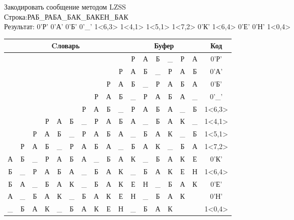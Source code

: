 \documentclass[a4paper, 12pt]{article}
\begin{document}
Закодировать сообщение методом LZSS\\
Строка:РАБ\_РАБА\_БАК\_БАКЕН\_БАК\\
Результат: 0'Р' 0'А' 0'Б' 0'\_' 1<6,3> 1<4,1> 1<5,1> 1<7,2> 0'К' 1<6,4> 0'Е' 0'Н' 1<0,4>\\
\begin{table}[h!]
\centering
\begin{tabular}{|c|c|c|c|c|c|c|c|c|c|c|c|c|c|c|c|c|}
\hline
\multicolumn{10}{|c|}{Cловарь} & \multicolumn{6}{c|}{Буфер} & Код  \\ \hline
  &   &   &   &   &   &   &   &   &   & Р & А & Б & \_ & Р & А & 0'Р'\\ \hline
  &   &   &   &   &   &   &   &   & Р & А & Б & \_ & Р & А & Б & 0'А'\\ \hline
  &   &   &   &   &   &   &   & Р & А & Б & \_ & Р & А & Б & А & 0'Б'\\ \hline
  &   &   &   &   &   &   & Р & А & Б & \_ & Р & А & Б & А & \_ & 0'\_'\\ \hline
  &   &   &   &   &   & \cellcolor[HTML]{FFFF00} Р & \cellcolor[HTML]{FFFF00} А & \cellcolor[HTML]{FFFF00} Б & \_ & \cellcolor[HTML]{FFFF00} Р & \cellcolor[HTML]{FFFF00} А & \cellcolor[HTML]{FFFF00} Б & А & \_ & Б & 1<6,3>\\ \hline
  &   &   & Р & \cellcolor[HTML]{FFFF00} А & Б & \_ & Р & А & Б & \cellcolor[HTML]{FFFF00} А & \_ & Б & А & К & \_ & 1<4,1>\\ \hline
  &   & Р & А & Б & \cellcolor[HTML]{FFFF00} \_ & Р & А & Б & А & \cellcolor[HTML]{FFFF00} \_ & Б & А & К & \_ & Б & 1<5,1>\\ \hline
  & Р & А & Б & \_ & Р & А & \cellcolor[HTML]{FFFF00} Б & \cellcolor[HTML]{FFFF00} А & \_ & \cellcolor[HTML]{FFFF00} Б & \cellcolor[HTML]{FFFF00} А & К & \_ & Б & А & 1<7,2>\\ \hline
А & Б & \_ & Р & А & Б & А & \_ & Б & А & К & \_ & Б & А & К & Е & 0'К'\\ \hline
Б & \_ & Р & А & Б & А & \cellcolor[HTML]{FFFF00} \_ & \cellcolor[HTML]{FFFF00} Б & \cellcolor[HTML]{FFFF00} А & \cellcolor[HTML]{FFFF00} К & \cellcolor[HTML]{FFFF00} \_ & \cellcolor[HTML]{FFFF00} Б & \cellcolor[HTML]{FFFF00} А & \cellcolor[HTML]{FFFF00} К & Е & Н & 1<6,4>\\ \hline
Б & А & \_ & Б & А & К & \_ & Б & А & К & Е & Н & \_ & Б & А & К & 0'Е'\\ \hline
А & \_ & Б & А & К & \_ & Б & А & К & Е & Н & \_ & Б & А & К &   & 0'Н'\\ \hline
\cellcolor[HTML]{FFFF00} \_ & \cellcolor[HTML]{FFFF00} Б & \cellcolor[HTML]{FFFF00} А & \cellcolor[HTML]{FFFF00} К & \_ & Б & А & К & Е & Н & \cellcolor[HTML]{FFFF00} \_ & \cellcolor[HTML]{FFFF00} Б & \cellcolor[HTML]{FFFF00} А & \cellcolor[HTML]{FFFF00} К &   &   & 1<0,4>\\ \hline
\end{tabular}
\end{table}
\end{document}

